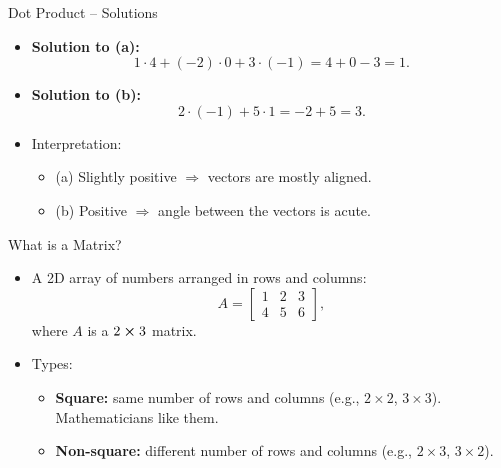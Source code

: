 \documentclass{beamer}
\begin{document}
\begin{frame}{Dot Product – Solutions}
  \begin{itemize}
    \item \textbf{Solution to (a):}
    \[
    1 \cdot 4 + (-2) \cdot 0 + 3 \cdot (-1) = 4 + 0 - 3 = \boxed{1}.
    \]
    \item \textbf{Solution to (b):}
    \[
    2 \cdot (-1) + 5 \cdot 1 = -2 + 5 = \boxed{3}.
    \]
    \item Interpretation:
    \begin{itemize}
      \item (a) Slightly positive \(\Rightarrow\) vectors are mostly aligned.
      \item (b) Positive \(\Rightarrow\) angle between the vectors is acute.
    \end{itemize}
  \end{itemize}
\end{frame}

\begin{frame}{What is a Matrix?}
  \begin{itemize}
    \item A 2D array of numbers arranged in rows and columns:
    \begin{equation}
    A = \begin{bmatrix} 1 & 2 & 3 \\ 4 & 5 & 6 \end{bmatrix},
    \end{equation}
    where \(A\) is a \(2\cross3\) matrix.
    \item Types:
    \begin{itemize}
      \item \textbf{Square:} same number of rows and columns (e.g., $2\times2$, $3\times3$). Mathematicians like them.
      \item \textbf{Non-square:} different number of rows and columns (e.g., $2\times3$, $3\times2$).
    \end{itemize}
  \end{itemize}
\end{frame}
\end{document}
